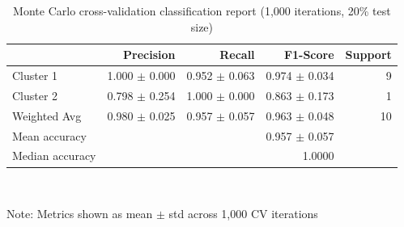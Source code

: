 \begin{table}[htbp]
  \centering
  \caption{Monte Carlo cross-validation classification report (1,000 iterations, 20\% test size)}
  \label{tab:03_LDA_Classification_mccv_classification_report}
  \begin{tabular}{lrrrr}
    \toprule
     & Precision & Recall & F1-Score & Support \\
    \midrule
    Cluster 1 & 1.000 $\pm$ 0.000 & 0.952 $\pm$ 0.063 & 0.974 $\pm$ 0.034 & 9 \\
    Cluster 2 & 0.798 $\pm$ 0.254 & 1.000 $\pm$ 0.000 & 0.863 $\pm$ 0.173 & 1 \\
    Weighted Avg & 0.980 $\pm$ 0.025 & 0.957 $\pm$ 0.057 & 0.963 $\pm$ 0.048 & 10 \\
    Mean accuracy &  &  & 0.957 $\pm$ 0.057 &  \\
    Median accuracy &  &  & 1.0000 &  \\
    \bottomrule
  \end{tabular}
  \\[4pt]
  \parbox{\textwidth}{\footnotesize Note: Metrics shown as mean $\pm$ std across 1,000 CV iterations}
\end{table}
